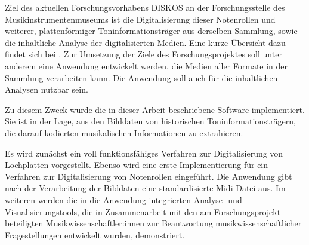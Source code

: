 Ziel des aktuellen Forschungsvorhabens DISKOS an der Forschungsstelle des Musikinstrumentenmuseums ist die Digitalisierung dieser Notenrollen und weiterer, plattenförmiger Toninformationsträger aus derselben Sammlung, sowie die inhaltliche Analyse der digitalisierten Medien.
Eine kurze Übersicht dazu findet sich bei \textcite[]{khulusi_2022}.
Zur Umsetzung der Ziele des Forschungsprojektes soll unter anderem eine Anwendung entwickelt werden, die Medien aller Formate in der Sammlung verarbeiten kann.
Die Anwendung soll auch für die inhaltlichen Analysen nutzbar sein.

Zu diesem Zweck wurde die in dieser Arbeit beschriebene Software implementiert.
Sie ist in der Lage, aus den Bilddaten von historischen Toninformationsträgern, die darauf kodierten musikalischen Informationen zu extrahieren.

Es wird zunächst ein voll funktionsfähiges Verfahren zur Digitalisierung von Lochplatten vorgestellt.
Ebenso wird eine erste Implementierung für ein Verfahren zur Digitalisierung von Notenrollen eingeführt.
Die Anwendung gibt nach der Verarbeitung der Bilddaten eine standardisierte Midi-Datei aus.
Im weiteren werden die in die Anwendung integrierten Analyse- und Visualisierungstools, die in Zusammenarbeit mit den am Forschungsprojekt beteiligten Musikwissenschaftler:innen zur Beantwortung musikwissenschaftlicher Fragestellungen entwickelt wurden, demonstriert.

